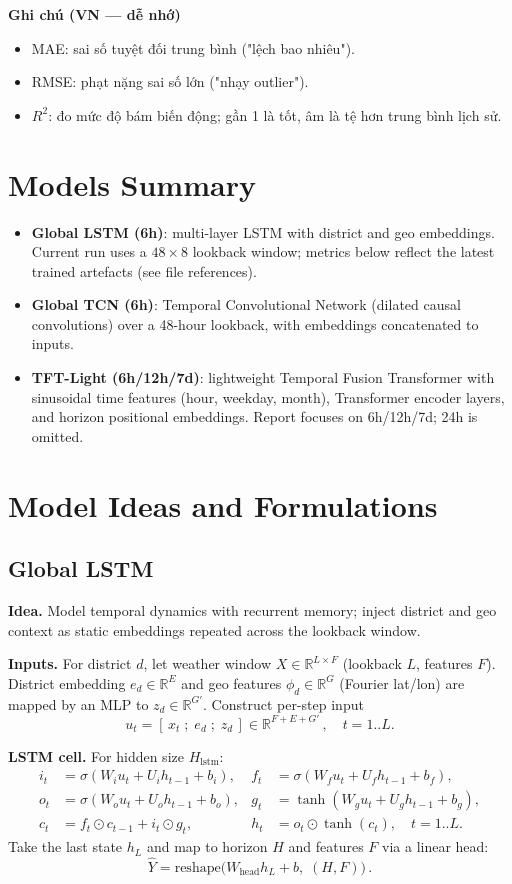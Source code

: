 \documentclass[12pt,a4paper]{article}
\begin{document}
\noindent\textbf{Ghi chú (VN — dễ nhớ)}
\begin{itemize}
    \item MAE: sai số tuyệt đối trung bình ("lệch bao nhiêu").
    \item RMSE: phạt nặng sai số lớn ("nhạy outlier").
    \item $R^2$: đo mức độ bám biến động; gần 1 là tốt, âm là tệ hơn trung bình lịch sử.
\end{itemize}

\section{Models Summary}
\begin{itemize}
    \item \textbf{Global LSTM (6h)}: multi-layer LSTM with district and geo embeddings. Current run uses a $48 \times 8$ lookback window; metrics below reflect the latest trained artefacts (see file references).
    \item \textbf{Global TCN (6h)}: Temporal Convolutional Network (dilated causal convolutions) over a 48-hour lookback, with embeddings concatenated to inputs.
    \item \textbf{TFT-Light (6h/12h/7d)}: lightweight Temporal Fusion Transformer with sinusoidal time features (hour, weekday, month), Transformer encoder layers, and horizon positional embeddings. Report focuses on 6h/12h/7d; 24h is omitted.
\end{itemize}

\section{Model Ideas and Formulations}
\subsection{Global LSTM}
\textbf{Idea.} Model temporal dynamics with recurrent memory; inject district and geo context as static embeddings repeated across the lookback window.

\noindent\textbf{Inputs.} For district $d$, let weather window $X\in\mathbb{R}^{L\times F}$ (lookback $L$, features $F$). District embedding $e_d\in\mathbb{R}^{E}$ and geo features $\phi_d\in\mathbb{R}^{G}$ (Fourier lat/lon) are mapped by an MLP to $z_d\in\mathbb{R}^{G'}$. Construct per-step input
\[
u_t = [\,x_t\;;\; e_d\;;\; z_d\,] \in \mathbb{R}^{F+E+G'}\,,\quad t=1..L.
\]

\noindent\textbf{LSTM cell.} For hidden size $H_{\text{lstm}}$:
\begin{align*}
i_t &= \sigma(W_i u_t + U_i h_{t-1} + b_i), & f_t &= \sigma(W_f u_t + U_f h_{t-1} + b_f),\\
o_t &= \sigma(W_o u_t + U_o h_{t-1} + b_o), & g_t &= \tanh(W_g u_t + U_g h_{t-1} + b_g),\\
c_t &= f_t\odot c_{t-1} + i_t\odot g_t, & h_t &= o_t\odot \tanh(c_t), \quad t=1..L.
\end{align*}
Take the last state $h_L$ and map to horizon $H$ and features $F$ via a linear head:
\[
\widehat{Y} = \mathrm{reshape}\big( W_{\text{head}} h_L + b,\; (H, F) \big)\,.
\]
\end{document}

